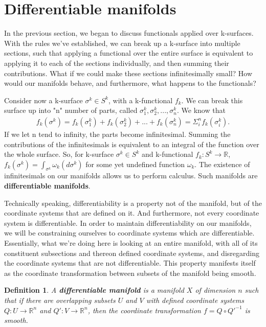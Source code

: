 \documentclass{book}
\newtheorem{defn}[equation]{Definition}
\begin{document}
\section{Differentiable manifolds}

In the previous section, we began to discuss functionals applied over k-surfaces. With the rules we've established, we can break up a k-surface into multiple sections, such that applying a functional over the entire surface is equivalent to applying it to each of the sections individually, and then summing their contributions. What if we could make these sections infinitesimally small? How would our manifolds behave, and furthermore, what happens to the functionals?

Consider now a k-surface $\sigma^k \in S^k$, with a k-functional $f_k$. We can break this surface up into "n" number of parts, called $\sigma^k_1, \sigma^k_2, ..., \sigma^k_n$. We know that \begin{gather} f_k(\sigma^k) = f_k(\sigma^k_1) + f_k(\sigma^k_2) + ... + f_k(\sigma^k_n) = \Sigma^n_if_k(\sigma^k_i).\end{gather} If we let n tend to infinity, the parts become infinitesimal. Summing the contributions of the infinitesimals is equivalent to an integral of the function over the whole surface. So, for k-surface $\sigma^k \in S^k$ and k-functional $f_k: S^k \to \mathbb{R}$, $f_k(\sigma^k) = \int_{\sigma^k}\omega_k(d\sigma^k)$ for some yet undefined function $\omega_k$. The existence of infinitesimals on our manifolds allows us to perform calculus. Such manifolds are \textbf{differentiable manifolds}. 

Technically speaking, differentiability is a property not of the manifold, but of the coordinate systems that are defined on it. And furthermore, not every coordinate system is differentiable. In order to maintain differentiability on our manifolds, we will be constraining ourselves to coordinate systems which are differentiable. Essentially, what we're doing here is looking at an entire manifold, with all of its constituent subsections and thereon defined coordinate systems, and disregarding the coordinate systems that are not differentiable. This property manifests itself as the coordinate transformation between subsets of the manifold being smooth. 


\begin{defn}
	A \textbf{differentiable manifold} is a manifold $X$ of dimension $n$ such that if there are overlapping subsets $U$ and $V$ with defined coordinate systems $Q: U \to \mathbb{R}^n$ and $Q': V \to \mathbb{R}^n$, then the coordinate transformation $f = Q \circ Q'^{-1}$ is smooth. 
\end{defn}
\end{document}

